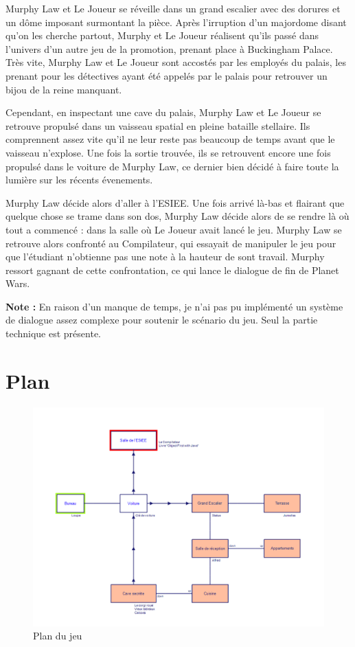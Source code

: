 Murphy Law et Le Joueur se réveille dans un grand escalier avec des dorures et un dôme imposant surmontant la pièce. Après l'irruption d'un majordome disant qu'on les cherche partout, Murphy et Le Joueur réalisent qu'ils passé dans l'univers d'un autre jeu de la promotion, prenant place à Buckingham Palace. Très vite, Murphy Law et Le Joueur sont accostés par les employés du palais, les prenant pour les détectives ayant été appelés par le palais pour retrouver un bijou de la reine manquant.

Cependant, en inspectant une cave du palais, Murphy Law et Le Joueur se retrouve propulsé dans un vaisseau spatial en pleine bataille stellaire. Ils comprennent assez vite qu'il ne leur reste pas beaucoup de temps avant que le vaisseau n'explose. Une fois la sortie trouvée, ils se retrouvent encore une fois propulsé dans le voiture de Murphy Law, ce dernier bien décidé à faire toute la lumière sur les récents évenements.

Murphy Law décide alors d'aller à l'ESIEE. Une fois arrivé là-bas et flairant que quelque chose se trame dans son dos, Murphy Law décide alors de se rendre là où tout a commencé : dans la salle où Le Joueur avait lancé le jeu. Murphy Law se retrouve alors confronté au Compilateur, qui essayait de manipuler le jeu pour que l'étudiant n'obtienne pas une note à la hauteur de sont travail. Murphy ressort gagnant de cette confrontation, ce qui lance le dialogue de fin de Planet Wars.

\textbf{Note :} En raison d'un manque de temps, je n'ai pas pu implémenté un système de dialogue assez complexe pour soutenir le scénario du jeu. Seul la partie technique est présente.

\section{Plan}

\begin{figure}[H]
  \includegraphics[width=\textwidth,height=\textheight,keepaspectratio]{./media/plan.png}
  \caption{Plan du jeu}
\end{figure}


